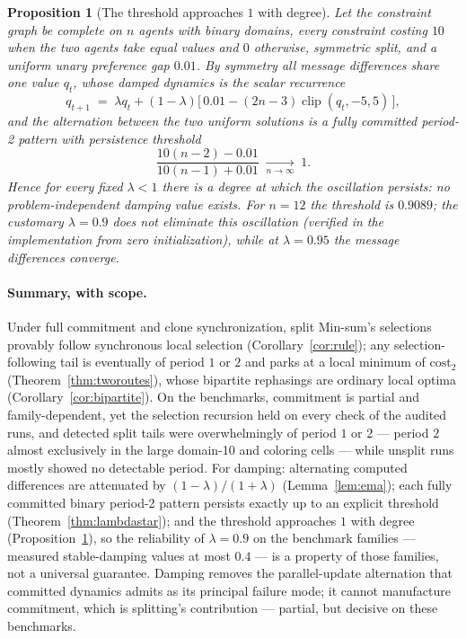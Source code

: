 \documentclass[letterpaper]{article} %
\newtheorem{proposition}[theorem]{Proposition}
\theoremstyle{definition}
\theoremstyle{remark}
\begin{document}
\begin{proposition}[The threshold approaches $1$ with degree]\label{prop:kn}
Let the constraint graph be complete on $n$ agents with binary domains,
every constraint costing $10$ when the two agents take equal values and
$0$ otherwise, symmetric split, and a uniform unary preference gap
$0.01$.  By symmetry all message differences share one value $q_t$,
whose damped dynamics is the scalar recurrence
\[
  q_{t+1} \;=\; \lambda q_t + (1-\lambda)\big[\,0.01 -
  (2n-3)\operatorname{clip}(q_t, -5, 5)\,\big],
\]
and the alternation between the two uniform solutions is a fully
committed period-2 pattern with persistence threshold
\[
  \frac{10(n-2) - 0.01}{10(n-1) + 0.01} \;\xrightarrow[n\to\infty]{}\; 1 .
\]
Hence for every fixed $\lambda < 1$ there is a degree at which the
oscillation persists: no problem-independent damping value exists.  For
$n = 12$ the threshold is $0.9089$; the customary $\lambda = 0.9$ does
not eliminate this oscillation (verified in the implementation from zero
initialization), while at $\lambda = 0.95$ the message differences
converge.
\end{proposition}

\paragraph{Summary, with scope.}
Under full commitment and clone synchronization, split Min-sum's
selections provably follow synchronous local selection
(Corollary~\ref{cor:rule}); any selection-following tail is eventually of
period $1$ or $2$ and parks at a local minimum of $\mathrm{cost}_2$
(Theorem~\ref{thm:tworoutes}), whose bipartite rephasings are ordinary
local optima (Corollary~\ref{cor:bipartite}).  On the benchmarks,
commitment is partial and family-dependent, yet the selection recursion
held on every check of the audited runs, and detected split tails were
overwhelmingly of period $1$ or $2$ --- period $2$ almost exclusively in
the large domain-10 and coloring cells --- while unsplit runs mostly
showed no detectable period.  For damping: alternating computed
differences are attenuated by $(1-\lambda)/(1+\lambda)$
(Lemma~\ref{lem:ema}); each fully committed binary period-2 pattern
persists exactly up to an explicit threshold
(Theorem~\ref{thm:lambdastar}); and the threshold approaches $1$ with
degree (Proposition~\ref{prop:kn}), so the reliability of
$\lambda = 0.9$ on the benchmark families --- measured stable-damping
values at most $0.4$ --- is a property of those families, not a universal
guarantee.  Damping removes the parallel-update alternation that
committed dynamics admits as its principal failure mode; it cannot
manufacture commitment, which is splitting's contribution --- partial,
but decisive on these benchmarks.
\end{document}
